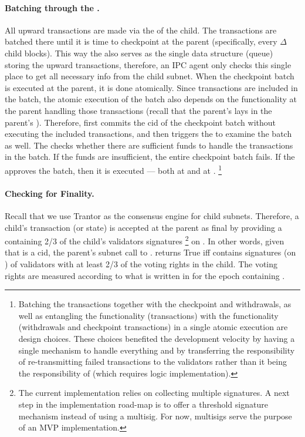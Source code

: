 \paragraph{Batching through the \gw.}
All upward transactions are made via the \gw of the child. The transactions are batched there until it is time to checkpoint at the parent (specifically, every $\Delta$ child blocks). This way the \gw also serves as the single data structure (queue) storing the upward transactions, therefore, an IPC agent only checks this single place to get all necessary info from the child subnet.
When the checkpoint batch is executed at the parent, it is done atomically. Since \postoffice transactions are included in the batch, the atomic execution of the batch also depends on the \postoffice functionality at the parent handling those transactions (recall that the parent's \postoffice lays in the parent's  \gw). Therefore, \sa first commits the cid of the checkpoint batch without executing the included transactions, and then triggers the \gw to examine the batch as well. The \gw checks whether there are sufficient funds to handle the \postoffice transactions in the batch. If the funds are insufficient, the entire checkpoint batch fails. If the \gw approves the batch, then it is executed --- both at \sa and at \gw.%
\footnote{Batching the \postoffice transactions together with the checkpoint and withdrawals, as well as entangling the \gw functionality (\postoffice transactions) with the \sa functionality (withdrawals and checkpoint transactions) in a single atomic execution are design choices. These choices benefited the development velocity by having a single mechanism to handle everything and by transferring the responsibility of re-transmitting failed \postoffice transactions to the validators rather than it being the responsibility of \sa (which requires logic implementation).}


 \paragraph{Checking for Finality.}
 Recall that we use Trantor as the consensus engine for child subnets. Therefore, a child's transaction (or state) \tx is accepted at the parent as final by providing a \prf containing 2/3 of the child's validators signatures%
 \footnote{The current implementation relies on collecting multiple signatures. A next step in the implementation road-map is to offer a threshold signature mechanism instead of using a multisig. For now, multisigs serve the purpose of an MVP implementation.} 
 on \tx. 
 In other words, given that \tx is a cid, the parent's subnet call to \sa.\verifyGfinal{\tx}{\prf} returns True iff \prf contains signatures (on \tx) of validators with at least 2/3 of the voting rights in the child. The voting rights are measured according to what is written in \sa for the epoch containing \tx.

